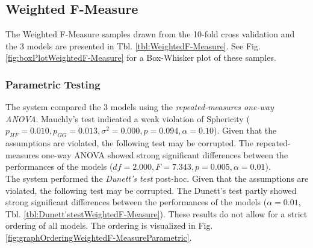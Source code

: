 \documentclass[a4paper,12pt]{article}
\begin{document}
\subsection{Weighted F-Measure}
The Weighted F-Measure samples drawn from the 10-fold cross validation and the 3 models are presented in Tbl. \ref{tbl:WeightedF-Measure}.
See Fig. \ref{fig:boxPlotWeightedF-Measure} for a Box-Whisker plot of these samples. 
\begin{table}[h!]
\centering
{}\caption{Samples of the Weighted F-Measure drawn from the 10-fold cross validation and the 3 models}
\label{tbl:WeightedF-Measure}
\end{table}

\subsubsection{Parametric Testing}The system compared the 3 models using the \emph{repeated-measures one-way ANOVA}. Mauchly's test indicated a weak violation of Sphericity ($p_{HF}=0.010, p_{GG}=0.013, \sigma^2=0.000, p=0.094, \alpha=0.10$). Given that the assumptions are violated, the following test may be corrupted. The repeated-measures one-way ANOVA showed strong significant differences between the performances of the models ($df=2.000, F=7.343, p=0.005, \alpha=0.01$).\\ 

 The system performed the \emph{Dunett's test} post-hoc. Given that the assumptions are violated, the following test may be corrupted. The Dunett's test partly showed strong significant differences between the performances of the models ($\alpha=0.01$, Tbl. \ref{tbl:Dunett'stestWeightedF-Measure}). These results do not allow for a strict ordering of all models. The ordering is visualized in Fig. \ref{fig:graphOrderingWeightedF-MeasureParametric}. 
\begin{table}[h!]
\centering
{}\caption{P-values from the Dunett's test for Weighted F-Measure}
\label{tbl:Dunett'stestWeightedF-Measure}
\end{table}
\end{document}
